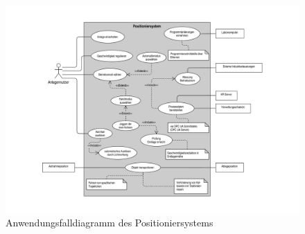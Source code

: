 \documentclass[../../../Bachelorarbeit.tex]{subfiles}
\begin{document}
\begin{figure}[h]
    \centering
    \includegraphics[width=\textwidth]{Images/use_case_dia.pdf}
    \caption[Anwendungsfalldiagramm]{Anwendungsfalldiagramm des Positioniersystems}
    \label{fig:my-img3}
\end{figure}
\end{document}
